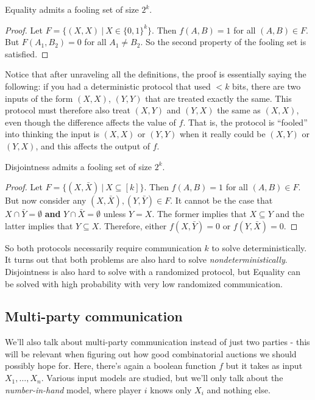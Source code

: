   \begin{proposition} Equality admits a fooling set of size $2^k$. 

  \end{proposition} \begin{proof} 
    Let $F = \{(X, X)\ |\ X \in \{0,1\}^k \}$.
    Then $f(A, B) = 1$ for all $(A, B) \in F$. But $F(A_1, B_2) = 0$ for
    all $A_1 \neq B_2$. So the second property of the fooling set is satisfied.
  \end{proof}

  Notice that after unraveling all the definitions, the proof is essentially
  saying the following: if you had a deterministic protocol that used $< k$ bits,
  there are two inputs of the form $(X, X)$, $(Y, Y)$ that are treated exactly the
  same. This protocol must therefore also treat $(X, Y)$ and $(Y, X)$ the same as
  $(X, X)$, even though the difference affects the value of $f$.
  That is, the protocol is ``fooled''
  into thinking the input is $(X, X)$ or $(Y, Y)$ when it really could be $(X, Y)$
  or $(Y, X)$, and this affects the output of $f$.

  \begin{proposition}
    Disjointness admits a fooling set of size $2^k$.
  \end{proposition} 
  \begin{proof} 
    Let $F = \{ (X, \bar{X})\ |\ X \subseteq [k] \}$.
    Then $f(A, B) = 1$ for all $(A, B) \in F$. But now consider any $(X,
    \bar{X}), (Y, \bar{Y}) \in F$. It cannot be the case that $X \cap \bar{Y} =
    \emptyset$ \textbf{and} $Y \cap \bar{X} = \emptyset$ unless $Y = X$. The
    former implies that $X \subseteq Y$ and the latter implies that $Y \subseteq
    X$. Therefore, either $f(X, \bar{Y}) = 0$ or $f(Y, \bar{X} ) = 0$.
  \end{proof}

  So both protocols necessarily require communication $k$ to solve
  deterministically. It turns out that both problems are also hard to solve
  \emph{nondeterministically}. Disjointness is also hard to solve with a
  randomized protocol, but Equality can be solved with high probability with very
  low randomized communication. 

  \subsection{Multi-party communication} 
    We'll also talk about multi-party
    communication instead of just two parties - this will be relevant when figuring
    out how good combinatorial auctions we should possibly hope for. Here, there's
    again a boolean function $f$ but it takes as input $X_1, \ldots, X_n$. Various
    input models are studied, but we'll only talk about the \emph{number-in-hand}
    model, where player $i$ knows only $X_i$ and nothing else. 


